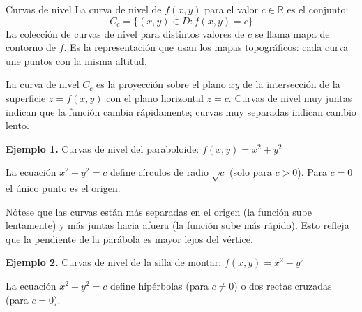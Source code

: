 \begin{mydefinition}{Curvas de nivel}
La curva de nivel de $f(x,y)$ para el valor $c \in \mathbb{R}$ es el conjunto:
\[ C_c = \{(x,y) \in D : f(x,y) = c\} \]
La colección de curvas de nivel para distintos valores de $c$ se llama mapa de contorno de $f$. Es la representación que usan los mapas topográficos: cada curva une puntos con la misma altitud.
\end{mydefinition}

La curva de nivel $C_c$ es la proyección sobre el plano $xy$ de la intersección de la superficie $z = f(x,y)$ con el plano horizontal $z = c$. Curvas de nivel muy juntas indican que la función cambia rápidamente; curvas muy separadas indican cambio lento.

\textbf{Ejemplo 1.} Curvas de nivel del paraboloide: $f(x,y) = x^2 + y^2$

La ecuación $x^2 + y^2 = c$ define círculos de radio $\sqrt{c}$ (solo para $c > 0$). Para $c = 0$ el único punto es el origen.

\begin{center}
\shorthandoff{>}
\end{center}

Nótese que las curvas están más separadas en el origen (la función sube lentamente) y más juntas hacia afuera (la función sube más rápido). Esto refleja que la pendiente de la parábola es mayor lejos del vértice.

\textbf{Ejemplo 2.} Curvas de nivel de la silla de montar: $f(x,y) = x^2 - y^2$

La ecuación $x^2 - y^2 = c$ define hipérbolas (para $c \neq 0$) o dos rectas cruzadas (para $c = 0$).

